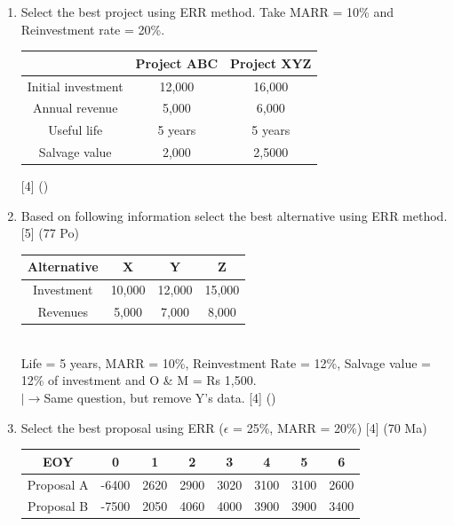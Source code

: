 \documentclass[12pt]{article}
\newcommand{\lb}{\\ $\left|\rightarrow\right.$}
\begin{document}
\begin{enumerate}
			\item Select the best project using ERR method. Take MARR = 10\% and Reinvestment rate = 20\%.\\
			\begin{tabular}{|c|c|c|}
				\hline
				& Project ABC & Project XYZ \\ \hline
				Initial investment & 12,000 & 16,000 \\ \hline
				Annual revenue & 5,000 & 6,000 \\ \hline
				Useful life & 5 years & 5 years \\ \hline
				Salvage value & 2,000 & 2,5000 \\ \hline
			\end{tabular}  \hfill [4] ()

			\item Based on following information select the best alternative using ERR method. \hfill [5] (77 Po)
			\begin{tabular}{|c|c|c|c|}
				\hline
				Alternative & X & Y & Z \\ \hline
				Investment & 10,000 & 12,000 & 15,000 \\ \hline
				Revenues & 5,000 & 7,000 & 8,000 \\ \hline
			\end{tabular}\\
			Life = 5 years, MARR = 10\%, Reinvestment Rate = 12\%, Salvage value = 12\% of investment and O \& M = Rs 1,500.
			\lb Same question, but remove Y's data. \hfill [4] () 
			
			\item Select the best proposal using ERR ($\epsilon$ = 25\%, MARR = 20\%) \hfill [4] (70 Ma)\\
			\begin{tabular}{|c|c|c|c|c|c|c|c|}
				\hline
				EOY & 0 & 1 & 2 & 3 & 4 & 5 & 6 \\ \hline
				Proposal A & -6400 & 2620 & 2900 & 3020 & 3100 & 3100 & 2600 \\ \hline
				Proposal B & -7500 & 2050 & 4060 & 4000 & 3900 & 3900 & 3400 \\ \hline
			\end{tabular}
		\end{enumerate}
	
\end{document}
